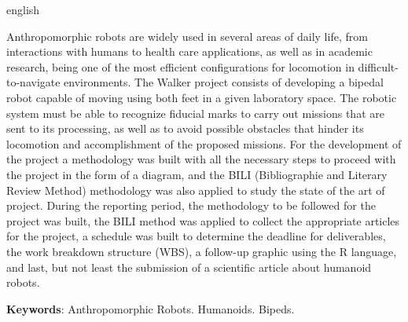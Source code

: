 \documentclass[
	12pt,				%
	openright,			%
	twoside,			%
	a4paper,			%
	english,			%
	french,				%
	spanish,			%
	brazil				%
	]{senai-cimatec-abntex2}
\begin{document}
\begin{resumo}[Abstract]
	\begin{otherlanguage*}{english}
		
		Anthropomorphic robots are widely used in several areas of daily life, from interactions with humans to health care applications, as well as in academic research, being one of the most efficient configurations for locomotion in difficult-to-navigate environments.\newline
		The Walker project consists of developing a bipedal robot capable of moving using both feet in a given laboratory space. The robotic system must be able to recognize fiducial marks to carry out missions that are sent to its processing, as well as to avoid possible obstacles that hinder its locomotion and accomplishment of the proposed missions. \newline
		For the development of the project a methodology was built with all the necessary steps to proceed with the project in the form of a diagram, and the BILI (Bibliographie and Literary Review Method) methodology was also applied to study the state of the art of project. \newline
		During the reporting period, the methodology to be followed for the project was built, the BILI method was applied to collect the appropriate articles for the project, a schedule was built to determine the deadline for deliverables, the work breakdown structure (WBS), a follow-up graphic using the R language, and last, but not least the submission of a scientific article about humanoid robots.

		\vspace{\onelineskip}

		\noindent
		\textbf{Keywords}: Anthropomorphic Robots. Humanoids. Bipeds.
	\end{otherlanguage*}
\end{resumo}



\end{document}
